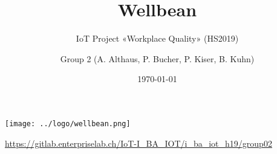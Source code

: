 \documentclass[a3paper,20pt,hidelinks]{scrartcl}
\begin{document}
\author{Group 2 (A. Althaus, P. Bucher, P. Kiser, B. Kuhn)}
\title{Wellbean}
\subtitle{IoT Project «Workplace Quality» (HS2019)}
\date{\today}
\maketitle

\centering
\texttt{[image: ../logo/wellbean.png]}

\vspace{3em}

\small
\url{https://gitlab.enterpriselab.ch/IoT-I_BA_IOT/i_ba_iot_h19/group02}
\end{document}

